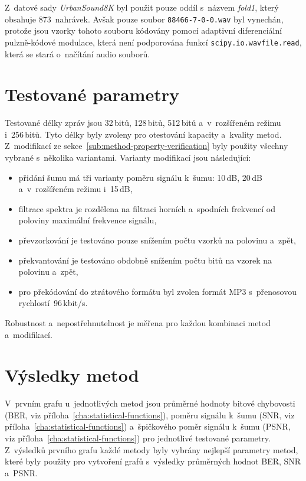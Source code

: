 Z~datové sady \textit{UrbanSound8K} byl použit pouze oddíl s~názvem
\textit{fold1}, který obsahuje 873~nahrávek. Avšak pouze soubor
\texttt{88466-7-0-0.wav} byl vynechán, protože jsou vzorky tohoto souboru
kódovány pomocí adaptivní diferenciální pulzně-kódové modulace, která není
podporována funkcí \texttt{scipy.io.wavfile.read}, která se stará o~načítání
audio souborů.

\section{Testované parametry}
\label{sec:tested-parameters}

Testované délky zpráv jsou 32\,bitů, 128\,bitů, 512\,bitů a~v~rozšířeném režimu
i~256\,bitů. Tyto délky byly zvoleny pro otestování kapacity a~kvality metod.
Z~modifikací ze sekce~\ref{sub:method-property-verification} byly použity
všechny vybrané s~několika variantami. Varianty modifikací jsou následující:

\begin{itemize}
    \item přidání šumu má tři varianty poměru signálu k~šumu: 10\,dB, 20\,dB
        a~v~rozšířeném režimu i~15\,dB,
    \item filtrace spektra je rozdělena na filtraci horních a~spodních
        frekvencí od poloviny maximální frekvence signálu,
    \item převzorkování je testováno pouze snížením počtu vzorků na polovinu
        a~zpět,
    \item překvantování je testováno obdobně snížením počtu bitů na vzorek na
        polovinu a~zpět,
    \item pro překódování do ztrátového formátu byl zvolen formát MP3
        s~přenosovou rychlostí~96\,kbit/s.
\end{itemize}

\noindent Robustnost a~nepostřehnutelnost je měřena pro každou kombinaci metod
a~modifikací.

\section{Výsledky metod}
\label{sec:evaluation-results}

V~prvním grafu u~jednotlivých metod jsou průměrné hodnoty bitové chybovosti
(BER, viz příloha~\ref{cha:statistical-functions}), poměru signálu k~šumu (SNR,
viz příloha~\ref{cha:statistical-functions}) a~špičkového poměr signálu k~šumu
(PSNR, viz příloha~\ref{cha:statistical-functions}) pro jednotlivé testované
parametry. Z~výsledků prvního grafu každé metody byly vybrány nejlepší
parametry metod, které byly použity pro vytvoření grafů s~výsledky průměrných
hodnot BER, SNR a~PSNR.

